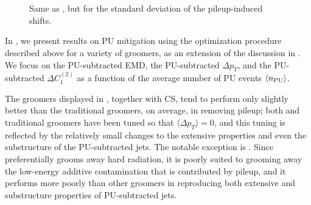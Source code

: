 \documentclass[letterpaper,11pt]{article}
\begin{document}
\begin{figure}[p]
\centering
    \\
    \\
\caption{
    Same as , but for the standard deviation of the pileup-induced shifts.
}
\label{fig:pufrenzy_stddev}
\end{figure}


In , we present results on PU mitigation using the optimization procedure described above for a variety of groomers, as an extension of the discussion in .
%
We focus on the PU-subtracted EMD, the PU-subtracted \(\Delta p_T\), and the PU-subtracted \(\Delta C_1^{(2)}\) as a function of the average number of PU events \(\langle n_{\rm PU} \rangle\).

The \PIRANHA{} groomers displayed in , together with CS, tend to perform only slightly better than the traditional groomers, on average, in removing pileup;
%
both \PIRANHA{} and traditional groomers have been tuned so that \(\langle \Delta p_T\rangle=0\), and this tuning is reflected by the relatively small changes to the extensive properties and even the substructure of the PU-subtracted jets.
%
The notable exception is .
%
Since  preferentially grooms away hard radiation, it is poorly suited to grooming away the low-energy additive contamination that is contributed by pileup, and it performs more poorly than other \PIRANHA{} groomers in reproducing both extensive and substructure properties of PU-subtracted jets.
\end{document}

